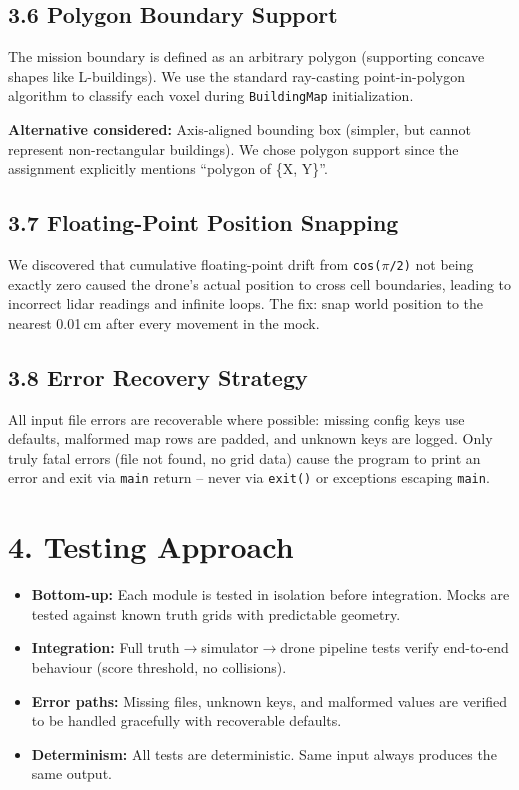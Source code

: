 \documentclass[12pt,a4paper]{article}
\begin{document}
\subsection{3.6 Polygon Boundary Support}

The mission boundary is defined as an arbitrary polygon (supporting concave
shapes like L-buildings). We use the standard ray-casting point-in-polygon
algorithm to classify each voxel during \texttt{BuildingMap} initialization.

\textbf{Alternative considered:} Axis-aligned bounding box (simpler, but cannot
represent non-rectangular buildings). We chose polygon support since the
assignment explicitly mentions ``polygon of \{X, Y\}''.

\subsection{3.7 Floating-Point Position Snapping}

We discovered that cumulative floating-point drift from \texttt{cos($\pi$/2)}
not being exactly zero caused the drone's actual position to cross cell
boundaries, leading to incorrect lidar readings and infinite loops. The fix:
snap world position to the nearest 0.01\,cm after every movement in the mock.

\subsection{3.8 Error Recovery Strategy}

All input file errors are recoverable where possible: missing config keys use
defaults, malformed map rows are padded, and unknown keys are logged. Only truly
fatal errors (file not found, no grid data) cause the program to print an error
and exit via \texttt{main} return -- never via \texttt{exit()} or exceptions
escaping \texttt{main}.

\section{4. Testing Approach}

\begin{itemize}[nosep]
\item \textbf{Bottom-up:} Each module is tested in isolation before integration.
      Mocks are tested against known truth grids with predictable geometry.
\item \textbf{Integration:} Full truth$\to$simulator$\to$drone pipeline tests
      verify end-to-end behaviour (score threshold, no collisions).
\item \textbf{Error paths:} Missing files, unknown keys, and malformed values
      are verified to be handled gracefully with recoverable defaults.
\item \textbf{Determinism:} All tests are deterministic. Same input always
      produces the same output.
\end{itemize}
\end{document}

